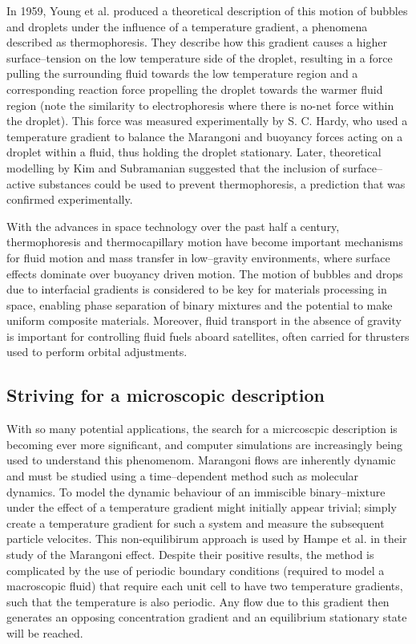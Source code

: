 In 1959, Young et al. produced a theoretical description of this motion of bubbles and droplets under the influence of a temperature gradient, a phenomena described as thermophoresis.\cite{Young1959}
They describe how this gradient causes a higher surface--tension on the low temperature side of the droplet, resulting in a force pulling the surrounding fluid towards the low temperature region and a corresponding reaction force propelling the droplet towards the warmer fluid region (note the similarity to electrophoresis where there is no-net force within the droplet).
This force was measured experimentally by S. C. Hardy,\cite{Hardy1978} who used a temperature gradient to balance the Marangoni and buoyancy forces acting on a droplet within a fluid, thus holding the droplet stationary.
Later, theoretical modelling by Kim and Subramanian suggested that the inclusion of surface--active substances could be used to prevent thermophoresis,\cite{KimSubramanianA,KimSubramanianB} a prediction that was confirmed experimentally.\cite{BartonSubramanian,ChenStebe}

With the advances in space technology over the past half a century, thermophoresis and thermocapillary motion have become important mechanisms for fluid motion and mass transfer in low--gravity environments, where surface effects dominate over buoyancy driven motion.
The motion of bubbles and drops due to interfacial gradients is considered to be key for materials processing in space, enabling phase separation of binary mixtures and the potential to make uniform composite materials.\cite{BartonSubramanian}
Moreover, fluid transport in the absence of gravity is important for controlling fluid fuels aboard satellites, often carried for thrusters used to perform orbital adjustments.\cite{MotionOfBubblesAndDrops} 

\subsection{Striving for a microscopic description}
With so many potential applications, the search for a micrcoscpic description is becoming ever more significant, and computer simulations are increasingly being used to understand this phenomenom.
Marangoni flows are inherently dynamic and must be studied using a time--dependent method such as molecular dynamics.
To model the dynamic behaviour of an immiscible binary--mixture under the effect of a temperature gradient might initially appear trivial; simply create a temperature gradient for such a system and measure the subsequent particle velocites.
This non-equilibirum approach is used by Hampe et al. in their study of the Marangoni effect.\cite{HolgerBoppHampe}
Despite their positive results, the method is complicated by the use of periodic boundary conditions (required to model a macroscopic fluid) that require each unit cell to have two temperature gradients, such that the temperature is also periodic.
Any flow due to this gradient then generates an opposing concentration gradient and an equilibrium stationary state will be reached.

